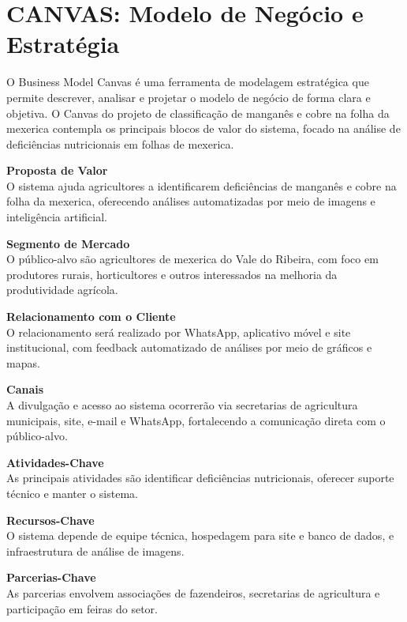\documentclass[11pt,a4paper]{article}
\begin{document}
\pagestyle{fancy}

\setcounter{tocdepth}{2}
\setcounter{secnumdepth}{2}
\tableofcontents
\newpage

\section{CANVAS: Modelo de Negócio e Estratégia}

O Business Model Canvas é uma ferramenta de modelagem estratégica que permite descrever, analisar e
projetar o modelo de negócio de forma clara e objetiva. O Canvas do projeto de classificação de manganês e cobre na folha da mexerica contempla os
principais blocos de valor do sistema, focado na análise de deficiências nutricionais em folhas de mexerica.

\medskip
\noindent\textbf{Proposta de Valor}\\
O sistema ajuda agricultores a identificarem deficiências de manganês e cobre na folha da mexerica, oferecendo
análises automatizadas por meio de imagens e inteligência artificial.

\medskip
\noindent\textbf{Segmento de Mercado}\\
O público-alvo são agricultores de mexerica do Vale do Ribeira, com foco em produtores rurais, horticultores e
outros interessados na melhoria da produtividade agrícola.

\medskip
\noindent\textbf{Relacionamento com o Cliente}\\
O relacionamento será realizado por WhatsApp, aplicativo móvel e site institucional, com feedback automatizado
de análises por meio de gráficos e mapas.

\medskip
\noindent\textbf{Canais}\\
A divulgação e acesso ao sistema ocorrerão via secretarias de agricultura municipais, site, e-mail e WhatsApp,
fortalecendo a comunicação direta com o público-alvo.

\medskip
\noindent\textbf{Atividades-Chave}\\
As principais atividades são identificar deficiências nutricionais, oferecer suporte técnico e manter o sistema.

\medskip
\noindent\textbf{Recursos-Chave}\\
O sistema depende de equipe técnica, hospedagem para site e banco de dados, e infraestrutura de análise de imagens.

\medskip
\noindent\textbf{Parcerias-Chave}\\
As parcerias envolvem associações de fazendeiros, secretarias de agricultura e participação em feiras do setor.
\end{document}
